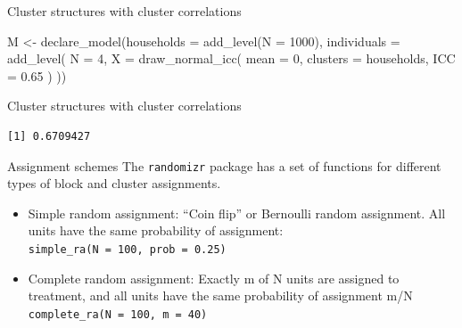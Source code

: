 \documentclass[
  11pt,
  ignorenonframetext,
]{beamer}
\newenvironment{Shaded}{\begin{snugshade}}{\end{snugshade}}
\newcommand{\AttributeTok}[1]{\textcolor[rgb]{0.40,0.45,0.13}{#1}}
\newcommand{\DecValTok}[1]{\textcolor[rgb]{0.68,0.00,0.00}{#1}}
\newcommand{\FloatTok}[1]{\textcolor[rgb]{0.68,0.00,0.00}{#1}}
\newcommand{\FunctionTok}[1]{\textcolor[rgb]{0.28,0.35,0.67}{#1}}
\newcommand{\NormalTok}[1]{\textcolor[rgb]{0.00,0.23,0.31}{#1}}
\newcommand{\OtherTok}[1]{\textcolor[rgb]{0.00,0.23,0.31}{#1}}
\newcommand{\SpecialCharTok}[1]{\textcolor[rgb]{0.37,0.37,0.37}{#1}}
\providecommand{\tightlist}{%
  \setlength{\itemsep}{0pt}\setlength{\parskip}{0pt}}\usepackage{longtable,booktabs,array}
\begin{document}
\begin{frame}[fragile]{Cluster structures with cluster correlations}
\protect\hypertarget{cluster-structures-with-cluster-correlations}{}
\begin{Shaded}
\begin{Highlighting}[]
\NormalTok{M }\OtherTok{\textless{}{-}}
  \FunctionTok{declare\_model}\NormalTok{(}\AttributeTok{households =} \FunctionTok{add\_level}\NormalTok{(}\AttributeTok{N =} \DecValTok{1000}\NormalTok{),}
                \AttributeTok{individuals =} \FunctionTok{add\_level}\NormalTok{(}
                  \AttributeTok{N =} \DecValTok{4}\NormalTok{,}
                  \AttributeTok{X =} \FunctionTok{draw\_normal\_icc}\NormalTok{(}
                    \AttributeTok{mean =} \DecValTok{0}\NormalTok{,}
                    \AttributeTok{clusters =}\NormalTok{ households,}
                    \AttributeTok{ICC =} \FloatTok{0.65}
\NormalTok{                  )}
\NormalTok{                ))}
\end{Highlighting}
\end{Shaded}
\end{frame}

\begin{frame}[fragile]{Cluster structures with cluster correlations}
\protect\hypertarget{cluster-structures-with-cluster-correlations-1}{}
\begin{Shaded}
\end{Shaded}

\begin{verbatim}
[1] 0.6709427
\end{verbatim}
\end{frame}

\begin{frame}[fragile]{Assignment schemes}
\protect\hypertarget{assignment-schemes}{}
The \texttt{randomizr} package has a set of functions for different
types of block and cluster assignments.

\begin{itemize}
\tightlist
\item
  Simple random assignment: ``Coin flip'' or Bernoulli random
  assignment. All units have the same probability of assignment:
  \texttt{simple\_ra(N\ =\ 100,\ prob\ =\ 0.25)}
\item
  Complete random assignment: Exactly m of N units are assigned to
  treatment, and all units have the same probability of assignment m/N
  \texttt{complete\_ra(N\ =\ 100,\ m\ =\ 40)}
\end{itemize}
\end{frame}
\end{document}
